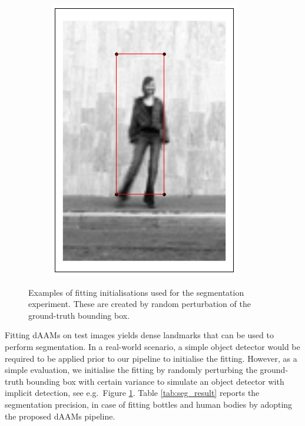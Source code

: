 \begin{figure}[!t]
\begin{subfigure}[b]{0.15\textwidth}
    \end{subfigure}
    \begin{subfigure}[b]{0.15\textwidth}
            \includegraphics[height=\textwidth]{Suplementory_Meterial/Segmentation_Measure/body}
    \end{subfigure}
    \caption{Examples of fitting initialisations used for the segmentation experiment. These are created by random perturbation of the ground-truth bounding box.}
    \label{fig:seg_init}
\end{figure}

Fitting dAAMs on test images yields dense landmarks that can be used to perform segmentation. In a real-world scenario, a simple object detector would be required to be applied prior to our pipeline to initialise the fitting. However, as a simple evaluation, we initialise the fitting by randomly perturbing the ground-truth bounding box with certain variance to simulate an object detector with implicit detection, see e.g.~Figure \ref{fig:seg_init}. Table  \ref{tab:seg_result} reports the segmentation precision, in case of fitting bottles and human bodies by adopting the proposed dAAMs pipeline.

